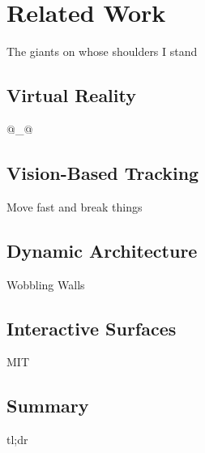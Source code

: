 \chapter{Related Work}

The giants on whose shoulders I stand

\section{Virtual Reality}

@\_@

\section{Vision-Based Tracking}

Move fast and break things

\section{Dynamic Architecture}

Wobbling Walls

\section{Interactive Surfaces}

MIT

\section{Summary}

tl;dr